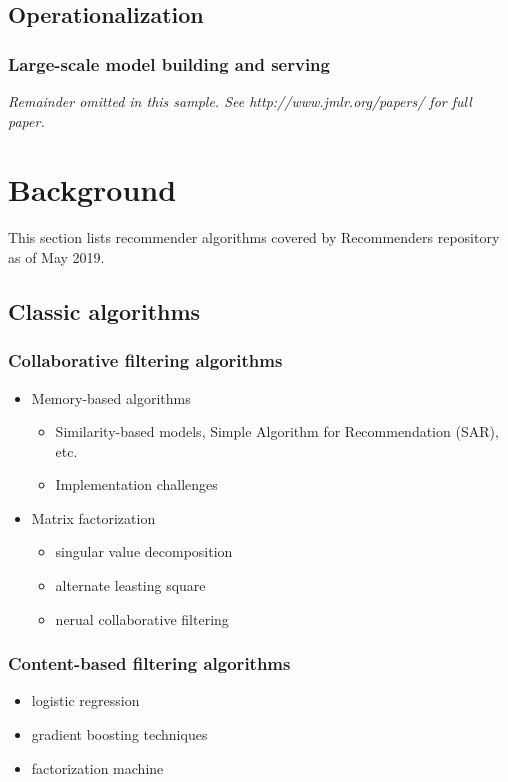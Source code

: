 \documentclass[twoside,11pt]{article}
\begin{document}
\subsection{Operationalization}
\subsubsection{Large-scale model building and serving}

{\noindent \em Remainder omitted in this sample. See http://www.jmlr.org/papers/ for full paper.}

\section{Background}
This section lists recommender algorithms covered by Recommenders repository as of May 2019.

\subsection{Classic algorithms}
\subsubsection{Collaborative filtering algorithms}
\begin{itemize}
  \item Memory-based algorithms
    \begin{itemize}
      \item Similarity-based models, Simple Algorithm for Recommendation (SAR), etc.
      \item Implementation challenges
    \end{itemize}
  \item Matrix factorization
    \begin{itemize} 
      \item singular value decomposition
      \item alternate leasting square
      \item nerual collaborative filtering
    \end{itemize}
\end{itemize}
\subsubsection{Content-based filtering algorithms}
\begin{itemize}
  \item logistic regression
  \item gradient boosting techniques
  \item factorization machine
\end{itemize}
\end{document}
